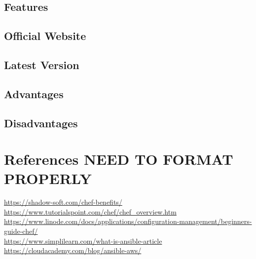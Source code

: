 \documentclass[a4paper, 12pt]{article}
\begin{document}
\subsection{Features}
\subsection{Official Website}
\subsection{Latest Version}
\subsection{Advantages}
\subsection{Disadvantages}

\newpage
\section{References NEED TO FORMAT PROPERLY}
\href{https://shadow-soft.com/chef-benefits/}{https://shadow-soft.com/chef-benefits/}\\
\href{https://www.tutorialspoint.com/chef/chef_overview.htm}{https://www.tutorialspoint.com/chef/chef\_overview.htm}\\
\href{https://www.linode.com/docs/applications/configuration-management/beginners-guide-chef/}{https://www.linode.com/docs/applications/configuration-management/beginners-guide-chef/}\\
\href{https://www.simplilearn.com/what-is-ansible-article}{https://www.simplilearn.com/what-is-ansible-article}\\
\href{https://cloudacademy.com/blog/ansible-aws/}{https://cloudacademy.com/blog/ansible-aws/}
\end{document}
